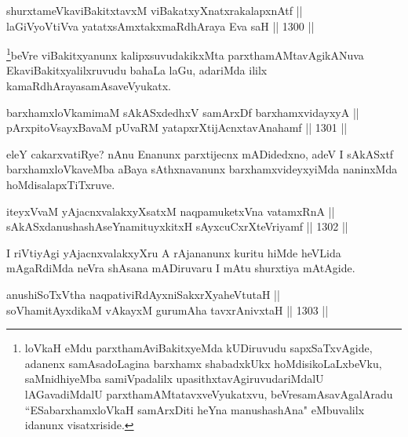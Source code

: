 
\begin{shl}
shurxtameVkaviBakitxtavxM viBakatxyXnatxrakalapxnAtf || \\
laGiVyoV\s tiVva yatatxsAmxtakxmaRdhAraya Eva saH \hfill || 1300 ||  
\end{shl}

\begin{artha}
\footnote{loVkaH eMdu parxthamAviBakitxyeMda kUDiruvudu sapxSaTxvAgide, adanenx samAsadoLagina barxhamx shabadxkUkx hoMdisikoLaLxbeVku, saMnidhiyeMba samiVpadalilx upasithxtavAgiruvudariMdalU lAGavadiMdalU parxthamAMtatavxveVyukatxvu, beVresamAsavAgalAradu ``ESabarxhamxloVkaH samArxDiti heYna manushashAna" eMbuvalilx idanunx visatxriside.}beVre viBakitxyanunx kalipxsuvudakikxMta parxthamAMtavAgikANuva EkaviBakitxyalilxruvudu bahaLa laGu, adariMda ililx kamaRdhArayasamAsaveVyukatx.
\end{artha}


\begin{shl}
barxhamxloVkamimaM sAkASxdedhxV samArxDf barxhamxvidayxyA || \\
pArxpitoV\s sayxBavaM pUvaRM yatapxrXtijAcnxtavAnahamf \hfill || 1301 ||  
\end{shl}

\begin{artha}
eleY cakarxvatiRye? nAnu Enanunx parxtijecnx mADidedxno, adeV I sAkASxtf barxhamxloVkaveMba aBaya sAthxnavanunx barxhamxvideyxyiMda naninxMda hoMdisalapxTiTxruve.
\end{artha}


\begin{shl}
iteyxVvaM yAjacnxvalakxyXsatxM naqpamuketxVna vatamxRnA || \\
sAkASxdanushashAseYnamituyxkitxH sAyxcuCxrXteVriyamf \hfill || 1302 ||  
\end{shl}

\begin{artha}
I riVtiyAgi yAjacnxvalakxyXru A rAjananunx kuritu hiMde heVLida mAgaRdiMda neVra shAsana mADiruvaru I mAtu shurxtiya mAtAgide.
\end{artha}


\begin{shl}
anushiSoTxV\s tha naqpativiRdAyxniSakxrXyaheVtutaH || \\
soV\s hamitAyxdikaM vAkayxM gurumAha tavxrAnivxtaH \hfill || 1303 ||  
\end{shl}

